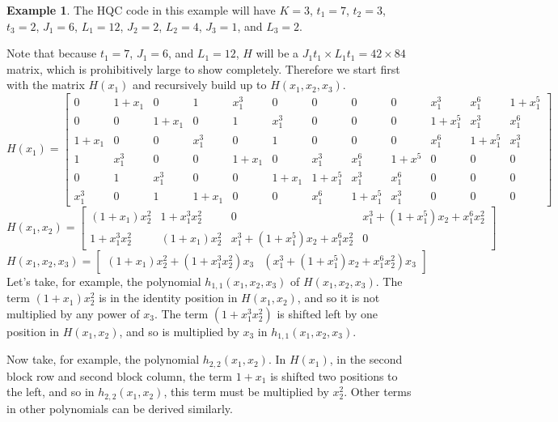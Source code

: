 \documentclass[11pt]{amsart}
\theoremstyle{definition}
\newtheorem{example}[theorem]{Example}
\newcommand{\0}{\mathbf{0}}
\begin{document}
\begin{example} \label{ex:hqc2}
    The HQC code in this example will have $K=3$, $t_1=7$, $t_2=3$, $t_3=2$, $J_1=6$, $L_1=12$, $J_2=2$, $L_2=4$, $J_3=1$, and $L_3=2$.

    Note that because $t_1=7$, $J_1=6$, and $L_1=12$, $H$ will be a $J_1 t_1 \times L_1 t_1 = 42 \times 84$ matrix, which is prohibitively large to show completely. Therefore we start first with the matrix $H(x_1)$ and recursively build up to $H(x_1,x_2,x_3)$.
    {\scriptsize
    \begin{equation}
        H(x_1) = \left[
        \begin{array}{ccc|ccc||ccc|ccc}
            0 & 1+x_1 & 0 & 1 & x_1^3 & 0 & 0 & 0 & 0 & x_1^3 & x_1^6 & 1+x_1^5 \\
            0 & 0 & 1+x_1 & 0 & 1 & x_1^3 & 0 & 0 & 0 & 1+x_1^5 & x_1^3 & x_1^6 \\
            1+x_1 & 0 & 0 & x_1^3 & 0 & 1 & 0 & 0 & 0 & x_1^6 & 1 +x_1^5 & x_1^3 \\
            \hline
            1 & x_1^3 & 0 & 0 & 1+x_1 & 0 & x_1^3 & x_1^6 & 1+x^5 & 0 & 0 & 0 \\
            0 & 1 & x_1^3 & 0 & 0 & 1+x_1 & 1+x_1^5 & x_1^3 & x_1^6 & 0 & 0 & 0 \\
            x_1^3 & 0 & 1 & 1+x_1 & 0 & 0 & x_1^6 & 1+x_1^5 & x_1^3 & 0 & 0 & 0 
        \end{array} \right]
    \end{equation}}
    {\small
    \begin{equation}
        {H(x_1,x_2) = \left[
        \begin{array}{cc|cc}
            (1+x_1)x_2^2 & 1+x_1^3 x_2^2 & 0 & x_1^3 + (1+x_1^5)x_2 + x_1^6 x_2^2 \\
            1 + x_1^3 x_2^2 & (1+x_1)x_2^2 & x_1^3 + (1+x_1^5) x_2 + x_1^6 x_2^2 & 0 
        \end{array} \right]}
    \end{equation}
    \begin{equation}
        {H(x_1,x_2,x_3) = \left[
        \begin{array}{cc}
            (1+x_1)x_2^2 + (1+x_1^3x_2^2)x_3 & (x_1^3 + (1+x_1^5)x_2 + x_1^6 x_2^2) x_3
        \end{array} \right]}
    \end{equation}}
    Let's take, for example, the polynomial $h_{1,1}(x_1,x_2,x_3)$ of $H(x_1,x_2,x_3)$. The term $(1+x_1)x_2^2$ is in the identity position in $H(x_1,x_2)$, and so it is not multiplied by any power of $x_3$. The term $(1+x_1^3x_2^2)$ is shifted left by one position in $H(x_1,x_2)$, and so is multiplied by $x_3$ in $h_{1,1}(x_1,x_2,x_3)$. 

    Now take, for example, the polynomial $h_{2,2}(x_1,x_2)$. In $H(x_1)$, in the second block row and second block column, the term $1+x_1$ is shifted two positions to the left, and so in $h_{2,2}(x_1,x_2)$, this term must be multiplied by $x_2^2$. Other terms in other polynomials can be derived similarly.
\end{example}
\end{document}
